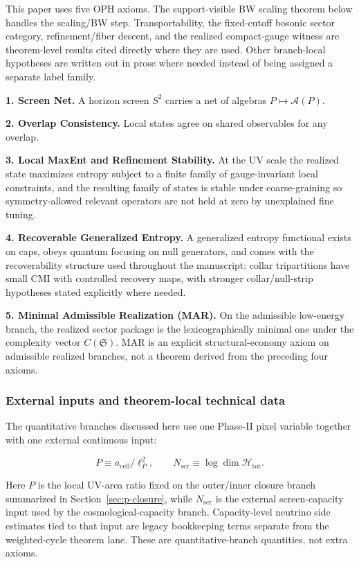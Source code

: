 This paper uses five OPH axioms. The support-visible BW scaling theorem below handles the scaling/BW step. Transportability, the fixed-cutoff bosonic sector category, refinement/fiber descent, and the realized compact-gauge witness are theorem-level results cited directly where they are used. Other branch-local hypotheses are written out in prose where needed instead of being assigned a separate label family.

\textbf{1. Screen Net.} A horizon screen \(S^2\) carries a net of algebras \(P \mapsto \mathcal{A}(P)\).

\textbf{2. Overlap Consistency.} Local states agree on shared observables for any overlap.

\textbf{3. Local MaxEnt and Refinement Stability.} At the UV scale the realized state maximizes entropy subject to a finite family of gauge-invariant local constraints, and the resulting family of states is stable under coarse-graining so symmetry-allowed relevant operators are not held at zero by unexplained fine tuning.

\textbf{4. Recoverable Generalized Entropy.} A generalized entropy functional exists on caps, obeys quantum focusing on null generators, and comes with the recoverability structure used throughout the manuscript: collar tripartitions have small CMI with controlled recovery maps, with stronger collar/null-strip hypotheses stated explicitly where needed.

\textbf{5. Minimal Admissible Realization (MAR).} On the admissible low-energy branch, the realized sector package is the lexicographically minimal one under the complexity vector \(C(\mathfrak S)\). MAR is an explicit structural-economy axiom on admissible realized branches, not a theorem derived from the preceding four axioms.

\subsubsection{External inputs and theorem-local technical data}\label{14-assumptions-and-external-inputs}

The quantitative branches discussed here use one Phase-II pixel variable together with one
external continuous input:

\[
P \equiv a_{\mathrm{cell}}/\ell_P^2,
\qquad
N_{\mathrm{scr}} \equiv \log \dim \mathcal H_{\mathrm{tot}}.
\]

Here \(P\) is the local UV-area ratio fixed on the outer/inner closure branch summarized in
Section~\ref{sec:p-closure}, while \(N_{\mathrm{scr}}\) is the external screen-capacity input
used by the cosmological-capacity branch. Capacity-level neutrino side estimates tied to that
input are legacy bookkeeping terms separate from the weighted-cycle theorem lane. These are
quantitative-branch quantities, not extra axioms.

